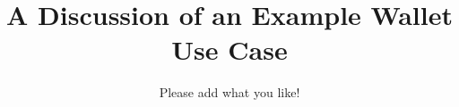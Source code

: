 \documentclass[letterpaper,10pt]{article}
\begin{document}
	
	\title{A Discussion of an Example Wallet Use Case}
	
	\author{%
		Please add what you like!
	}


		
	\maketitle

%		

	\newpage	




	
\end{document}
